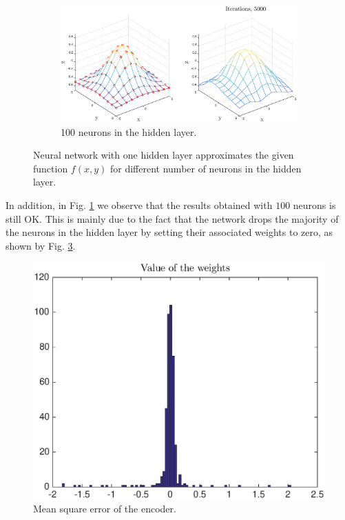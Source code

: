 \documentclass[letterpaper, 10 pt, conference]{ieeeconf}  %
\begin{document}
\begin{figure}
    \begin{subfigure}[b]{0.85\textwidth}
        \includegraphics[width=\textwidth]{function_approximation_100}
        \caption{100 neurons in the hidden layer.}
        \label{fig:33}
    \end{subfigure}
    \caption{Neural network with one hidden layer approximates the given function $f(x,y)$ for different number of neurons in the hidden layer.}
    \label{f:3}
\end{figure}

In addition, in Fig. \ref{fig:33} we observe that the results obtained with $100$ neurons is still OK. This is mainly due to the fact that the network drops the majority of the neurons in the hidden layer by setting their associated weights to zero, as shown by Fig. \ref{f:4}. 

\begin{figure}[h]
\centering
\includegraphics[scale=0.4]{function_approximation_100_hist}
\caption{Mean square error of the encoder.}
\label{f:4}
\end{figure}
\end{document}
